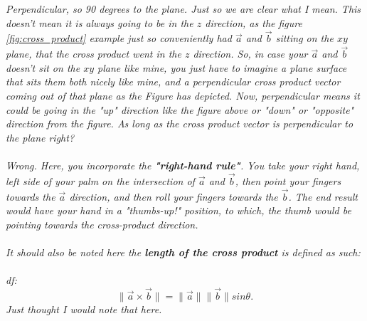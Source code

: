 \documentclass[addpoints]{exam}
\begin{document}
\textit{Perpendicular, so 90 degrees to the plane. Just so we are clear what I mean. This doesn't mean it is always going to be in the $z$ direction, as the figure \ref{fig:cross_product} example just so conveniently had $\vec{a}$ and $\vec{b}$ sitting on the $xy$ plane, that the cross product went in the $z$ direction. So, in case your $\vec{a}$ and $\vec{b}$ doesn't sit on the $xy$ plane like mine, you just have to imagine a plane surface that sits them both nicely like mine, and a perpendicular cross product vector coming out of that plane as the Figure has depicted. Now, perpendicular means it could be going in the "up" direction like the figure above or "down" or "opposite" direction from the figure. As long as the cross product vector is perpendicular to the plane right? \\\\
Wrong. Here, you incorporate the \textbf{"right-hand rule"}. You take your right hand, left side of your palm on the intersection of $\vec{a}$ and $\vec{b}$, then point your fingers towards the $\vec{a}$ direction, and then roll your fingers towards the $\vec{b}$. The end result would have your hand in a "thumbs-up!" position, to which, the thumb would be pointing towards the cross-product direction.
}\\\\
\textit{
It should also be noted here the\textbf{ length of the cross product} is defined as such: \\\\
df:
\[
\|\vec{a}\times\vec{b}\|=
\|\vec{a}\|\|\vec{b}\|sin\theta.
\]
Just thought I would note that here.
}
\end{document}
